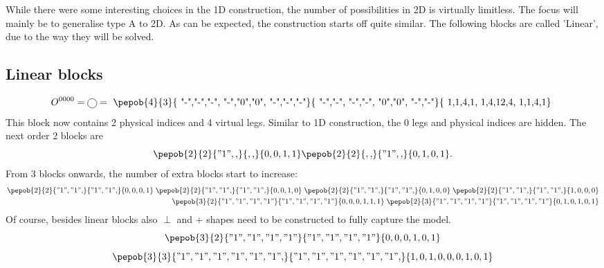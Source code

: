 While there were some interesting choices in the 1D construction, the number of possibilities in 2D is virtually limitless. The focus will mainly be to generalise type A to 2D. As can be expected, the construction starts off quite similar. The following blocks are called 'Linear', due to the way they will be solved.

\subsection{Linear blocks}\label{subsec:lin_block_Def}

\begin{equation}
    O^{0 0 0 0 }= \mpob{1}{ {,}  }{}{}{}{{,,}} = \vcenter{ \hbox{ \pepob{4}{3}{{
                        "-","-","-",
                        "-","0","0",
                        "-","-","-"}}{{
                        "-","-",
                        "-","-",
                        "0","0",
                        "-","-"}}{{
                        1,1,4,1,
                        1,4,12,4,
                        1,1,4,1}} }}
\end{equation}
This block now contains 2 physical indices and 4 virtual legs. Similar to 1D construction, the 0 legs and physical indices are hidden. The next order 2 blocks are
\begin{equation}\label{2dblocksorder2}
    \pepob{2}{2}{{"1",,}}{{,,}}{{0,0,1,1}}  \pepob{2}{2}{{,,}}{{"1",,}}{{0,1,0,1}}.
\end{equation}
From 3 blocks onwards, the number of extra blocks start to increase:
\begin{equation}
    \begin{split}
        \pepob{2}{2}{{"1","1",}}{{"1","1",}}{{0,0,0,1}} \;  \pepob{2}{2}{{"1","1",}}{{"1","1",}}{{0,0,1,0}} \; \pepob{2}{2}{{"1","1",}}{{"1","1",}}{{0,1,0,0}} \; \pepob{2}{2}{{"1","1",}}{{"1","1",}}{{1,0,0,0}}\\
        \pepob{3}{2}{{"1","1","1","1"}}{{"1","1","1","1"}}{{0,0,0,1,1,1}} \; \pepob{2}{3}{{"1","1","1","1"}}{{"1","1","1","1"}}{{0,1,0,1,0,1}}
    \end{split}
\end{equation}
Of course, besides linear blocks also $\perp$ and + shapes need to be constructed to fully capture the model.
\begin{equation}
    \pepob{3}{2}{{"1","1","1","1"}}{{"1","1","1","1"}}{{0,0,0,1,0,1}}
\end{equation}
\begin{equation}
    \pepob{3}{3}{{"1","1","1","1","1","1",}}{{"1","1","1","1","1","1",}}{{1,0,1,0,0,0,1,0,1}}
\end{equation}
